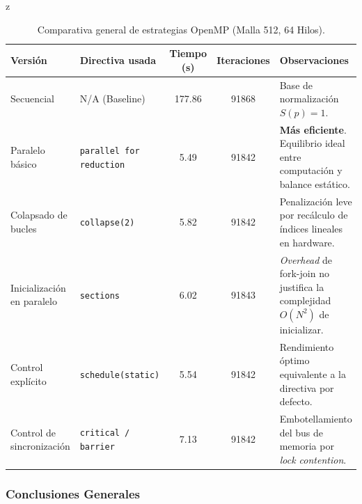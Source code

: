 z\documentclass[11pt,a4paper]{article}
\begin{document}
\begin{table}[H]
\centering
\renewcommand{\arraystretch}{1.2}
\small
\begin{tabular}{|m{3.5cm}|m{3cm}|c|c|m{3.5cm}|}
\hline
\textbf{Versión} & \textbf{Directiva usada} & \textbf{Tiempo (s)} & \textbf{Iteraciones} & \textbf{Observaciones} \\ \hline
Secuencial & N/A (Baseline) & 177.86 & 91868 & Base de normalización $S(p)=1$. \\ \hline
Paralelo básico & \texttt{parallel for reduction} & 5.49 & 91842 & \textbf{Más eficiente}. Equilibrio ideal entre computación y balance estático. \\ \hline
Colapsado de bucles & \texttt{collapse(2)} & 5.82 & 91842 & Penalización leve por recálculo de índices lineales en hardware. \\ \hline
Inicialización en paralelo & \texttt{sections} & 6.02 & 91843 & \textit{Overhead} de fork-join no justifica la complejidad $O(N^2)$ de inicializar. \\ \hline
Control explícito & \texttt{schedule(static)} & 5.54 & 91842 & Rendimiento óptimo equivalente a la directiva por defecto. \\ \hline
Control de sincronización & \texttt{critical / barrier} & 7.13 & 91842 & Embotellamiento del bus de memoria por \textit{lock contention}. \\ \hline
\end{tabular}
\caption{Comparativa general de estrategias OpenMP (Malla 512, 64 Hilos).}
\label{tab:comparativa_final}
\end{table}

\subsubsection*{Conclusiones Generales}
\end{document}
